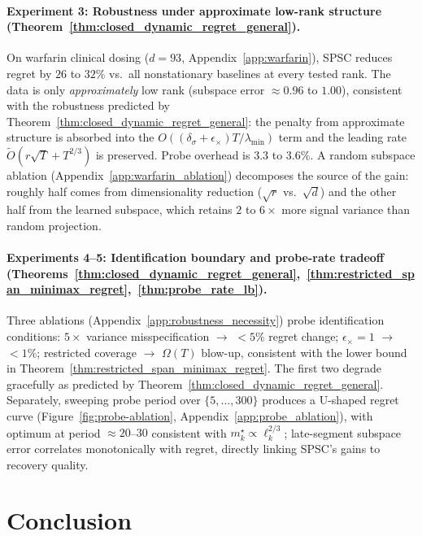 \documentclass{article}
\begin{document}
    \paragraph{Experiment 3: Robustness under approximate low-rank structure (Theorem~\ref{thm:closed_dynamic_regret_general}).}
    On warfarin clinical dosing ($d{=}93$, Appendix~\ref{app:warfarin}), SPSC reduces regret by
    $26$ to $32\%$ vs.\ all nonstationary baselines at every tested rank. The data is only \emph{approximately} low rank
    (subspace error $\approx 0.96$ to $1.00$), consistent with the robustness predicted by Theorem~\ref{thm:closed_dynamic_regret_general}: the penalty from approximate
    structure is absorbed into the $O((\delta_\sigma + \epsilon_\times)T/\lambda_{\min})$ term and the leading rate $\widetilde{O}(r\sqrt{T} + T^{2/3})$ is preserved. Probe
    overhead is $3.3$ to $3.6\%$.
    A random subspace ablation (Appendix~\ref{app:warfarin_ablation}) decomposes the source of the gain: roughly half comes
    from dimensionality reduction ($\sqrt{r}$ vs.\ $\sqrt{d}$) and the other half from the learned subspace,
    which retains $2$ to $6\times$ more signal variance than random projection.

  \paragraph{Experiments 4--5: Identification boundary and probe-rate tradeoff
  (Theorems~\ref{thm:closed_dynamic_regret_general},~\ref{thm:restricted_span_minimax_regret},~\ref{thm:probe_rate_lb}).}
  Three ablations (Appendix~\ref{app:robustness_necessity}) probe identification conditions:
  $5\times$ variance misspecification $\to$ ${<}5\%$ regret change;
  $\epsilon_\times{=}1$ $\to$ ${<}1\%$; restricted coverage $\to$ $\Omega(T)$ blow-up,
  consistent with the lower bound in Theorem~\ref{thm:restricted_span_minimax_regret}.
  The first two degrade gracefully as predicted by Theorem~\ref{thm:closed_dynamic_regret_general}.
  Separately, sweeping probe period over $\{5,\ldots,300\}$ produces a U-shaped regret curve
  (Figure~\ref{fig:probe-ablation}, Appendix~\ref{app:probe_ablation}),
  with optimum at period ${\approx}20$--$30$ consistent with $m_k^\star \propto \ell_k^{2/3}$;
  late-segment subspace error correlates monotonically with regret, directly linking SPSC's gains to recovery quality.

\vspace{-2pt}
\section{Conclusion}
\label{sec:conclusion}
\end{document}

